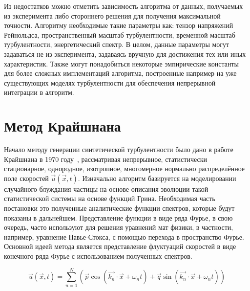 Из недостатков можно отметить зависимость алгоритма от данных, получаемых из эксперимента либо стороннего решения для получения максимальной точности. Алгоритму необходимые такие параметры как: тензор напряжений Рейнольдса, пространственный масштаб турбулентности, временной масштаб турбулентности, энергетический спектр. В целом, данные параметры могут задаваться не из эксперимента, задаваясь вручную для достижения тех или иных характеристик. Также могут понадобиться некоторые эмпирические константы для более сложных имплементаций алгоритма, построенные например на уже существующих моделях турбулентности для обеспечения непрерывной интеграции в алгоритм. 

\section{Метод Крайшнана} \label{sect2_1}

Начало методу генерации синтетической турбулентности было дано в работе Крайшнана в 1970 году~\cite{Kraichnan70}, рассматривая непрерывное, статистически стационарное, однородное, изотропное, многомерное нормально распределённое поле скоростей $\Vec{u}(\vec{x}, t)$. Изначально алгоритм базируется на моделировании случайного блуждания частицы на основе описания эволюции такой статистической системы на основе функций Грина. Необходимая часть постановки это полученные аналитические функции спектров, которые будут показаны в дальнейшем. Представление функции в виде ряда Фурье, в свою очередь, часто используют для решения уравнений мат физики, в частности, например, уравнение Навье-Стокса, с помощью перехода в пространство Фурье. Основной идеей метода является представление флуктуаций скоростей в виде конечного ряда Фурье с использованием полученных спектров. 

\begin{equation}
  \label{eq:spectral_equation1}
  \vec{u} (\vec{x}, t) = \sum_{n=1}^{N} \left( \vec{p} \cos{(\vec{k_n} \cdot \vec{x} + \omega_n t)} + \vec{q} \sin{(\vec{k_n} \cdot \vec{x} + \omega_n t)} \right)
\end{equation}


